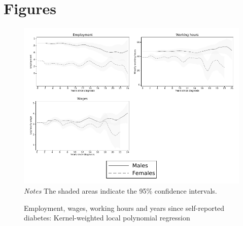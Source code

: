 \documentclass[12pt,english]{article}
\begin{document}
\setcounter{figure}{0}
\setcounter{page}{1}
\renewcommand{\thefigure}{\arabic{figure}}
\section*{Figures}


\begin{figure}[!ht]
	\caption{\label{fig:Kernel-weighted-local-polynomial_comb}Employment, wages, working hours and years since self-reported diabetes:  Kernel-weighted local polynomial regression}%
	\begin{center}
		\includegraphics[width=\linewidth]{figures/lpoly_combined.pdf}\\
		\footnotesize{\textit{Notes} The shaded areas indicate the 95\% confidence intervals.}
	\end{center}
\end{figure}
\end{document}
